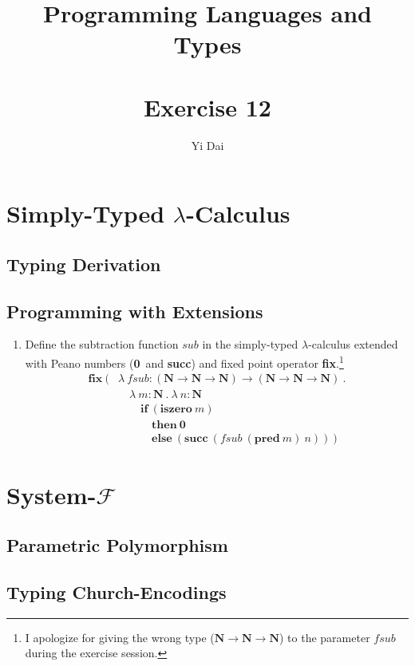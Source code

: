 \documentclass[a4paper,12pt]{article}
\title{
 Programming Languages and Types \\~\\
 \textbf{Exercise 12}
}
\author{
 Yi Dai
}
\newcommand{\NatT}{\textbf{N}}
\newcommand{\raro}{\rightarrow}
\newcommand{\lamb}{\lambda}
\newcommand{\zero}{\textbf{0}}
\renewcommand{\succ}{\textbf{succ}}
\newcommand{\pred}{\textbf{pred}}
\newcommand{\isze}{\textbf{iszero}}
\newcommand{\ifkw}{\textbf{if}}
\newcommand{\thkw}{\textbf{then}}
\newcommand{\elkw}{\textbf{else}}
\newcommand{\fixp}{\textbf{fix}}
\begin{document}
\maketitle

\section{Simply-Typed $\lambda$-Calculus}

\subsection{Typing Derivation}

\subsection{Programming with Extensions}

\begin{enumerate}
 \item Define the subtraction function $sub$ in the simply-typed $\lamb$-calculus extended with Peano numbers
  (\zero\ and \succ) and fixed point operator \fixp.\footnote{I apologize for giving the wrong type ($\NatT
  \raro \NatT \raro \NatT$) to the parameter $fsub$ during the exercise session.}
  \begin{align*}
   \fixp\ (& \lamb\ fsub : (\NatT \raro \NatT \raro \NatT) \raro (\NatT \raro \NatT \raro \NatT)\ . \\
           & \quad \lamb\ m : \NatT\ .\ \lamb\ n : \NatT \\
           & \quad \quad \ifkw\ (\isze\ m) \\
           & \quad \quad \quad \thkw\ \zero \\
           & \quad \quad \quad \elkw\ (\succ\ (fsub\ (\pred\ m)\ n))\ )
  \end{align*}
\end{enumerate}

\section{System-$\mathcal{F}$}

\subsection{Parametric Polymorphism}

\subsection{Typing Church-Encodings}
\end{document}
